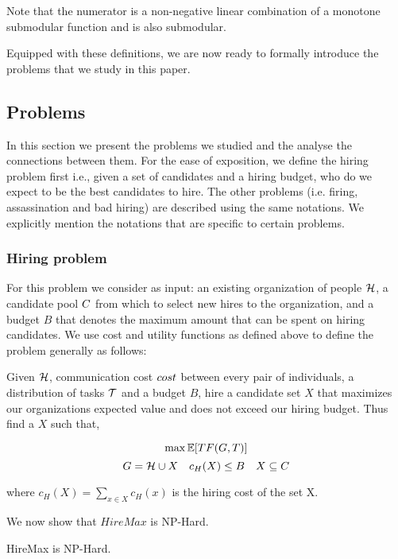 Note that the numerator is a non-negative linear combination of a monotone submodular function and is also submodular.

Equipped with these definitions, we are now ready to formally introduce the problems that we study in this paper.

\subsection{Problems}

In this section we present the problems we studied and the analyse the connections between them. For the ease of exposition, we define the hiring problem first i.e., given a set of candidates and a hiring budget, who do we expect to be the best candidates to hire. The other problems (i.e. firing, assassination and bad hiring) are described using the same notations. We explicitly mention the notations that are specific to certain problems.

\subsubsection{Hiring problem}

For this problem we consider as input: an existing organization of people $\mathcal{H}$, a candidate pool ${C}$ from which to select new hires to the organization, and a budget $B$ that denotes the maximum amount that can be spent on hiring candidates.
We use cost and utility functions as defined above to define the problem generally as follows:
\begin{problem}
[HireMax] Given $\mathcal{H}$, communication cost $cost$ between every pair of individuals, a distribution of tasks $\mathcal{T}$ and a budget $B$, hire a candidate set $X$ that maximizes our organizations expected value and does not exceed our hiring budget. Thus find a $X$ such that,

$$ \max \mathbb{E}[TF(G,T)]  $$
$$ G=\mathcal{H}  \cup X \quad c_H(X) \le B \quad X \subseteq C $$

where $c_H(X) = \sum_{x \in X} c_H(x)$ is the hiring cost of the set X.
 
\end{problem}

We now show that $HireMax$ is NP-Hard.

\begin{theorem} \label{thm:HM-hardness}
HireMax is NP-Hard.
\end{theorem}

